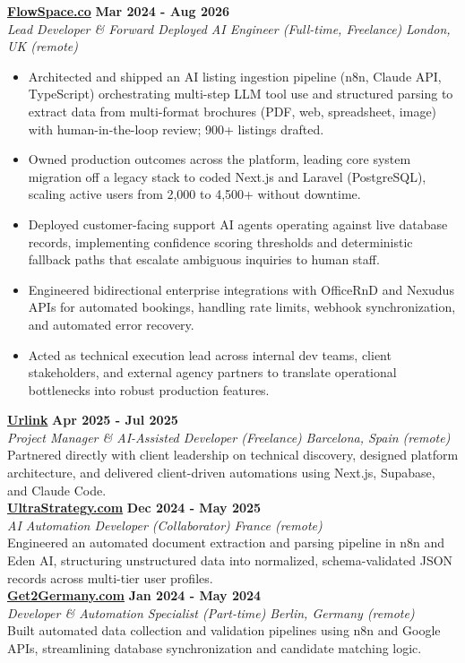 \documentclass[a4paper,10pt]{article}
\newcommand{\role}[4]{%
  \textbf{#1} \hfill \textbf{#2}\\[1pt]%
  \textit{#3} \hfill \textit{#4}\\[2pt]%
}
\begin{document}
\role{\href{https://flowspace.co}{FlowSpace.co}}{Mar 2024 - Aug 2026}{Lead Developer \& Forward Deployed AI Engineer (Full-time, Freelance)}{London, UK (remote)}
\begin{itemize}
  \item Architected and shipped an AI listing ingestion pipeline (n8n, Claude API, TypeScript) orchestrating multi-step LLM tool use and structured parsing to extract data from multi-format brochures (PDF, web, spreadsheet, image) with human-in-the-loop review; 900+ listings drafted.
  \item Owned production outcomes across the platform, leading core system migration off a legacy stack to coded Next.js and Laravel (PostgreSQL), scaling active users from 2,000 to 4,500+ without downtime.
  \item Deployed customer-facing support AI agents operating against live database records, implementing confidence scoring thresholds and deterministic fallback paths that escalate ambiguous inquiries to human staff.
  \item Engineered bidirectional enterprise integrations with OfficeRnD and Nexudus APIs for automated bookings, handling rate limits, webhook synchronization, and automated error recovery.
  \item Acted as technical execution lead across internal dev teams, client stakeholders, and external agency partners to translate operational bottlenecks into robust production features.
\end{itemize}

\role{\href{https://smarturlink.com/}{Urlink}}{Apr 2025 - Jul 2025}{Project Manager \& AI-Assisted Developer (Freelance)}{Barcelona, Spain (remote)}
Partnered directly with client leadership on technical discovery, designed platform architecture, and delivered client-driven automations using Next.js, Supabase, and Claude Code.\\[1pt]

\role{\href{https://ultrastrategy.com}{UltraStrategy.com}}{Dec 2024 - May 2025}{AI Automation Developer (Collaborator)}{France (remote)}
Engineered an automated document extraction and parsing pipeline in n8n and Eden AI, structuring unstructured data into normalized, schema-validated JSON records across multi-tier user profiles.\\[1pt]

\role{\href{https://get2germany.com}{Get2Germany.com}}{Jan 2024 - May 2024}{Developer \& Automation Specialist (Part-time)}{Berlin, Germany (remote)}
Built automated data collection and validation pipelines using n8n and Google APIs, streamlining database synchronization and candidate matching logic.\\[1pt]
\end{document}
